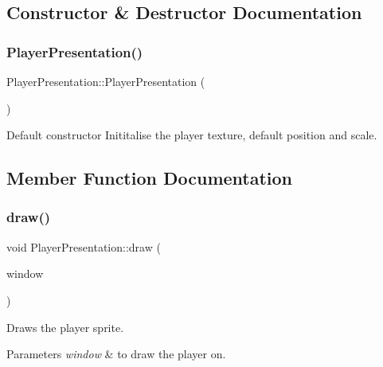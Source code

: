 \subsection{Constructor \& Destructor Documentation}
\mbox{\label{class_player_presentation_ae5b2e1e54cb57697d020eb1afe45225f}} 
\subsubsection{\texorpdfstring{Player\+Presentation()}{PlayerPresentation()}}
{\footnotesize\ttfamily Player\+Presentation\+::\+Player\+Presentation (\begin{DoxyParamCaption}{ }\end{DoxyParamCaption})}

Default constructor Inititalise the player texture, default position and scale. 

\subsection{Member Function Documentation}
\mbox{\label{class_player_presentation_a0ee08eeb4f0c8687450f60d635b4fe8a}} 
\subsubsection{\texorpdfstring{draw()}{draw()}}
{\footnotesize\ttfamily void Player\+Presentation\+::draw (\begin{DoxyParamCaption}\item[{Render\+Window \&}]{window }\end{DoxyParamCaption})}



Draws the player sprite. 


\begin{DoxyParams}{Parameters}
{\em window} & to draw the player on. \\
\hline
\end{DoxyParams}
\mbox{\label{class_player_presentation_a5ce015d2ac13d9e3eacf89b96da31ee2}} 
